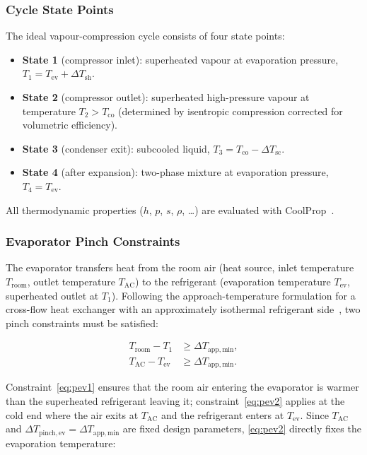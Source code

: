 \documentclass[12pt, a4paper]{article}
\newcommand{\Tco}{T_{\mathrm{co}}}
\newcommand{\Tev}{T_{\mathrm{ev}}}
\newcommand{\Troom}{T_{\mathrm{room}}}
\newcommand{\TAC}{T_{\mathrm{AC}}}
\newcommand{\dTpin}[1]{\Delta T_{\mathrm{pinch,#1}}}
\newcommand{\dTapp}{\Delta T_{\mathrm{app,min}}}
\newcommand{\dTsh}{\Delta T_{\mathrm{sh}}}
\newcommand{\dTsc}{\Delta T_{\mathrm{sc}}}
\begin{document}
\subsubsection{Cycle State Points}

The ideal vapour-compression cycle consists of four state points:
\begin{itemize}
  \item \textbf{State 1} (compressor inlet): superheated vapour at evaporation
        pressure, $T_1 = \Tev + \dTsh$.
  \item \textbf{State 2} (compressor outlet): superheated high-pressure vapour
        at temperature $T_2 > \Tco$ (determined by isentropic compression
        corrected for volumetric efficiency).
  \item \textbf{State 3} (condenser exit): subcooled liquid,
        $T_3 = \Tco - \dTsc$.
  \item \textbf{State 4} (after expansion): two-phase mixture at evaporation
        pressure, $T_4 = \Tev$.
\end{itemize}
All thermodynamic properties ($h$, $p$, $s$, $\rho$, \ldots) are evaluated with
CoolProp~\cite{coolprop}.

\subsubsection{Evaporator Pinch Constraints}

The evaporator transfers heat from the room air (heat source, inlet temperature
$\Troom$, outlet temperature $\TAC$) to the refrigerant (evaporation temperature
$\Tev$, superheated outlet at $T_1$).
Following the approach-temperature formulation for a cross-flow heat exchanger with
an approximately isothermal refrigerant side~\cite{coolprop}, two pinch constraints
must be satisfied:

\begin{align}
  \Troom - T_1
    &\geq \dTapp, \tag{P-ev-1}\label{eq:pev1}\\[2pt]
  \TAC - \Tev
    &\geq \dTapp. \tag{P-ev-2}\label{eq:pev2}
\end{align}

Constraint~\eqref{eq:pev1} ensures that the room air entering the evaporator is warmer
than the superheated refrigerant leaving it; constraint~\eqref{eq:pev2} applies at the
cold end where the air exits at $\TAC$ and the refrigerant enters at $\Tev$.
Since $\TAC$ and $\dTpin{ev} = \dTapp$ are fixed design parameters,
\eqref{eq:pev2} directly fixes the evaporation temperature:
\end{document}
